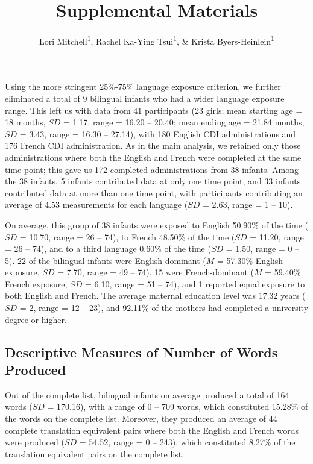 \documentclass[
  ,man,floatsintext]{apa6}
\title{Supplemental Materials}
\author{Lori Mitchell\textsuperscript{1}, Rachel Ka-Ying Tsui\textsuperscript{1}, \& Krista Byers-Heinlein\textsuperscript{1}}
\date{}
\affiliation{\vspace{0.5cm}\textsuperscript{1} Concordia University}
\begin{document}
\maketitle

\captionsetup[table]{labelformat=empty}

Using the more stringent 25\%-75\% language exposure criterion, we further eliminated a total of 9 bilingual infants who had a wider language exposure range. This left us with data from 41 participants (23 girls; mean starting age = 18 months, \(SD\) = 1.17, range = 16.20 -- 20.40; mean ending age = 21.84 months, \(SD\) = 3.43, range = 16.30 -- 27.14), with 180 English CDI administrations and 176 French CDI administration. As in the main analysis, we retained only those administrations where both the English and French were completed at the same time point; this gave us 172 completed administrations from 38 infants. Among the 38 infants, 5 infants contributed data at only one time point, and 33 infants contributed data at more than one time point, with participants contributing an average of 4.53 measurements for each language (\(SD\) = 2.63, range = 1 -- 10).

On average, this group of 38 infants were exposed to English 50.90\% of the time (\(SD\) = 10.70, range = 26 -- 74), to French 48.50\% of the time (\(SD\) = 11.20, range = 26 -- 74), and to a third language 0.60\% of the time (\(SD\) = 1.50, range = 0 -- 5). 22 of the bilingual infants were English-dominant (\(M\) = 57.30\% English exposure, \(SD\) = 7.70, range = 49 -- 74), 15 were French-dominant (\(M\) = 59.40\% French exposure, \(SD\) = 6.10, range = 51 -- 74), and 1 reported equal exposure to both English and French. The average maternal education level was 17.32 years (\(SD\) = 2, range = 12 -- 23), and 92.11\% of the mothers had completed a university degree or higher.

\hypertarget{descriptive-measures-of-number-of-words-produced}{%
\subsection{Descriptive Measures of Number of Words Produced}\label{descriptive-measures-of-number-of-words-produced}}

Out of the complete list, bilingual infants on average produced a total of 164 words (\(SD\) = 170.16), with a range of 0 -- 709 words, which constituted 15.28\% of the words on the complete list. Moreover, they produced an average of 44 complete translation equivalent pairs where both the English and French words were produced (\(SD\) = 54.52, range = 0 -- 243), which constituted 8.27\% of the translation equivalent pairs on the complete list.
\end{document}
